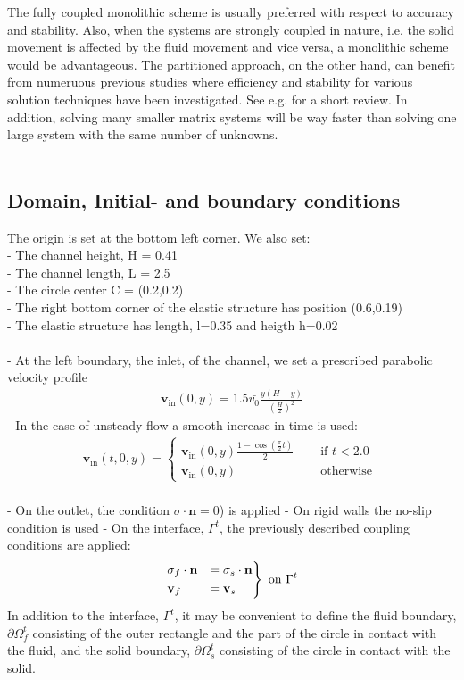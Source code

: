 The fully coupled monolithic scheme is usually preferred with respect to accuracy and stability. Also, when the systems are strongly coupled in nature, i.e. the solid movement is affected by the fluid movement and vice versa, a monolithic scheme would be advantageous. The partitioned approach, on the other hand, can benefit from numeruous previous studies where efficiency and stability for various solution techniques have been investigated. See e.g. \cite{Tang14} for a short review. In addition, solving many smaller matrix systems will be way faster than solving one large system with the same number of unknowns.
\\
\\
\subsection{Domain, Initial- and boundary conditions}
The origin is set at the bottom left corner. We also set:
\\ - The channel height, H = 0.41
\\ - The channel length, L = 2.5
\\ - The circle center C = (0.2,0.2)
\\ - The right bottom corner of the elastic structure has position (0.6,0.19) 
\\ - The elastic structure has length, l=0.35 and heigth h=0.02
\\
\\
- At the left boundary, the inlet, of the channel, we set a prescribed parabolic velocity profile
\begin{align}
\mathbf{v}_{\text{in}}(0,y) = 1.5\bar{v_0}\frac{y(H-y)}{(\frac{H}{2})^2}
\end{align}
- In the case of unsteady flow a smooth increase in time is used:
\begin{align}
 \mathbf{v}_{\text{in}}(t,0,y)= \begin{cases}
				\mathbf{v}_{\text{in}}(0,y)\frac{1-\cos(\frac{\pi}{2}t)}{2} & \quad \text{ if } t<2.0 \\
				\mathbf{v}_{\text{in}}(0,y) & \quad  \text{ otherwise }
		 		\end{cases}
\end{align}
\\
- On the outlet, the condition $\sigma \cdot \mathbf{n} = 0$) is applied
- On rigid walls the no-slip condition is used
- On the interface, $\Gamma^t$, the previously described coupling conditions are applied:
\begin{align}
\begin{rcases}
\sigma_f \cdot \mathbf{n} & =  \sigma_s \cdot \mathbf{n} \\
\mathbf{v}_f & = \mathbf{v}_s
\end{rcases}
\text{ on } \Gamma^t
\end{align}
In addition to the interface, $\Gamma^t$, it may be convenient to define the fluid boundary, $\partial \Omega_f^t$ consisting of the outer rectangle and the part of the circle in contact with the fluid, and the solid boundary, $\partial \Omega_s^t$ consisting of the circle in contact with the solid. 
\clearpage



